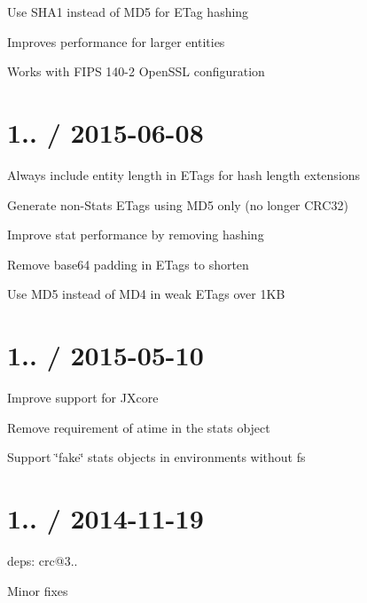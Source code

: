 
\begin{DoxyItemize}
\item Use S\+H\+A1 instead of M\+D5 for E\+Tag hashing
\begin{DoxyItemize}
\item Improves performance for larger entities
\item Works with F\+I\+PS 140-\/2 Open\+S\+SL configuration
\end{DoxyItemize}
\end{DoxyItemize}

\section*{1.. / 2015-\/06-\/08 }


\begin{DoxyItemize}
\item Always include entity length in E\+Tags for hash length extensions
\item Generate non-\/\+Stats E\+Tags using M\+D5 only (no longer C\+R\+C32)
\item Improve stat performance by removing hashing
\item Remove base64 padding in E\+Tags to shorten
\item Use M\+D5 instead of M\+D4 in weak E\+Tags over 1\+KB
\end{DoxyItemize}

\section*{1.. / 2015-\/05-\/10 }


\begin{DoxyItemize}
\item Improve support for J\+Xcore
\item Remove requirement of {\ttfamily atime} in the stats object
\item Support \char`\"{}fake\char`\"{} stats objects in environments without {\ttfamily fs}
\end{DoxyItemize}

\section*{1.. / 2014-\/11-\/19 }


\begin{DoxyItemize}
\item deps\+: crc@3..
\begin{DoxyItemize}
\item Minor fixes
\end{DoxyItemize}
\end{DoxyItemize}

